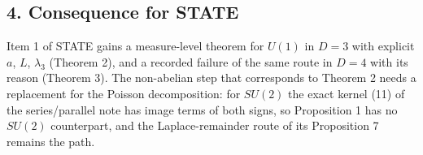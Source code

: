 \documentclass[11pt,a4paper]{article}
\begin{document}
\hypertarget{consequence-for-state}{%
\subsection{4. Consequence for STATE}\label{consequence-for-state}}

Item 1 of STATE gains a measure-level theorem for \(U(1)\) in \(D=3\)
with explicit \(a\), \(L\), \(\lambda_3\) (Theorem 2), and a recorded
failure of the same route in \(D=4\) with its reason (Theorem 3). The
non-abelian step that corresponds to Theorem 2 needs a replacement for
the Poisson decomposition: for \(SU(2)\) the exact kernel (11) of the
series/parallel note has image terms of both signs, so Proposition 1 has
no \(SU(2)\) counterpart, and the Laplace-remainder route of its
Proposition 7 remains the path.
\end{document}
